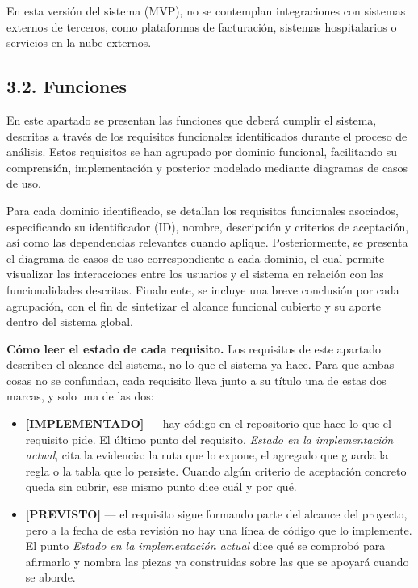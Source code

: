 \documentclass[12pt,a4paper]{article}
\newcommand{\subsectiontitle}[1]{%
  \subsection*{#1}
  \addcontentsline{toc}{subsection}{#1}
}
\newcommand{\estadoImplementado}{\textcolor{mainRed}{\textbf{[IMPLEMENTADO]}}}
\newcommand{\estadoPrevisto}{\textcolor{mainGray}{\textbf{[PREVISTO]}}}
\begin{document}
En esta versión del sistema (MVP), no se contemplan integraciones con sistemas externos de terceros, como plataformas de facturación, sistemas hospitalarios o servicios en la nube externos.

\subsectiontitle{3.2. Funciones}

En este apartado se presentan las funciones que deberá cumplir el sistema, descritas a través de los requisitos funcionales identificados durante el proceso de análisis. Estos requisitos se han agrupado por dominio funcional, facilitando su comprensión, implementación y posterior modelado mediante diagramas de casos de uso.

Para cada dominio identificado, se detallan los requisitos funcionales asociados, especificando su identificador (ID), nombre, descripción y criterios de aceptación, así como las dependencias relevantes cuando aplique. Posteriormente, se presenta el diagrama de casos de uso correspondiente a cada dominio, el cual permite visualizar las interacciones entre los usuarios y el sistema en relación con las funcionalidades descritas. Finalmente, se incluye una breve conclusión por cada agrupación, con el fin de sintetizar el alcance funcional cubierto y su aporte dentro del sistema global.

\textbf{Cómo leer el estado de cada requisito.} Los requisitos de este apartado describen el alcance del sistema, no lo que el sistema ya hace. Para que ambas cosas no se confundan, cada requisito lleva junto a su título una de estas dos marcas, y solo una de las dos:

\begin{itemize}
  \item \estadoImplementado{} — hay código en el repositorio que hace lo que el requisito pide. El último punto del requisito, \textit{Estado en la implementación actual}, cita la evidencia: la ruta que lo expone, el agregado que guarda la regla o la tabla que lo persiste. Cuando algún criterio de aceptación concreto queda sin cubrir, ese mismo punto dice cuál y por qué.

  \item \estadoPrevisto{} — el requisito sigue formando parte del alcance del proyecto, pero a la fecha de esta revisión no hay una línea de código que lo implemente. El punto \textit{Estado en la implementación actual} dice qué se comprobó para afirmarlo y nombra las piezas ya construidas sobre las que se apoyará cuando se aborde.
\end{itemize}
\end{document}
